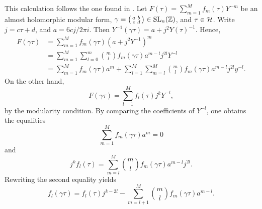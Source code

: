 \begin{calc} \label{cp:almost-holomorphic-modular-form-no-constant-term}
 This calculation follows the one found in \cite{Bloch-Okounkov}.
 Let $F(\tau)=\sum_{m=1}^Mf_m(\tau)Y^{-m}$ be an almost holomorphic modular form, $\gamma=
 \bigl(\begin{smallmatrix}
 a&b\\ c&d
 \end{smallmatrix} \bigr)
 \in \operatorname{SL}_n(\mathbb{Z})$,
 and $\tau \in \mathcal{H}$.
 Write $j=c\tau+d$, and $a=6cj/2\pi i$. Then $Y^{-1}(\gamma\tau)=a+j^2Y(\tau)^{-1}$. Hence,
 \begin{align*}
  F(\gamma\tau)&=\sum_{m=1}^Mf_m(\gamma\tau)(a+j^2Y^{-1})^m\\
               &=\sum_{m=1}^M\sum_{l=0}^m\binom{m}{l}f_m(\gamma\tau)a^{m-l}j^{2l}Y^{-l}\\
               &=\sum_{m=1}^Mf_m(\gamma\tau)a^m + \sum_{l=1}^M\sum_{m=l}^M\binom{m}{l}f_m(\gamma\tau)a^{m-l}j^{2l}y^{-l}.
 \end{align*}
 On the other hand,
 \[F(\gamma\tau)=\sum_{l=1}^Mf_l(\tau)j^kY^{-l},\]
 by the modularity condition. By comparing the coefficients of $Y^{-l}$, one obtains the equalities
 \begin{equation} \label{eq:coeff-zero}
 \sum_{m=1}^Mf_m(\gamma\tau)a^m=0
 \end{equation} and \[j^kf_l(\tau)=\sum_{m=l}^M\binom{m}{l}f_m(\gamma\tau)a^{m-l}j^{2l}.\]
 Rewriting the second equality yields
 \begin{equation} \label{eq:coeff-l}
  f_l(\gamma\tau)=f_l(\tau)j^{k-2l}-\sum_{m=l+1}^M\binom{m}{l}f_m(\gamma\tau)a^{m-l}.
 \end{equation}


\end{calc}
